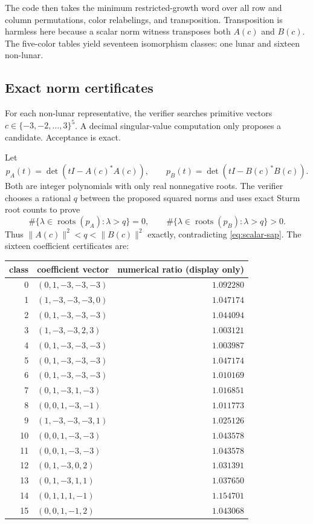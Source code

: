 \documentclass[11pt]{article}
\begin{document}
The code then takes the minimum restricted-growth word over all row and column
permutations, color relabelings, and transposition.  Transposition is harmless
here because a scalar norm witness transposes both $A(c)$ and $B(c)$.  The
five-color tables yield seventeen isomorphism classes: one lunar and sixteen
non-lunar.

\subsection{Exact norm certificates}

For each non-lunar representative, the verifier searches primitive vectors
$c\in\{-3,-2,\ldots,3\}^5$.  A decimal singular-value computation only
proposes a candidate.  Acceptance is exact.

Let
\[
 p_A(t)=\det(tI-A(c)^*A(c)),\qquad
 p_B(t)=\det(tI-B(c)^*B(c)).
\]
Both are integer polynomials with only real nonnegative roots.  The verifier
chooses a rational $q$ between the proposed squared norms and uses exact Sturm
root counts to prove
\[
 \#\{\lambda\in\operatorname{roots}(p_A):\lambda>q\}=0,
 \qquad
 \#\{\lambda\in\operatorname{roots}(p_B):\lambda>q\}>0.
\]
Thus $\|A(c)\|^2<q<\|B(c)\|^2$ exactly, contradicting
\eqref{eq:scalar-sap}.  The sixteen coefficient certificates are:

\begin{center}
\small
\begin{longtable}{@{}r l r@{}}
\toprule
class & coefficient vector & numerical ratio (display only)\\
\midrule
\endhead
0  & $(0,1,-3,-3,-3)$   & $1.092280$\\
1  & $(1,-3,-3,-3,0)$   & $1.047174$\\
2  & $(0,1,-3,-3,-3)$   & $1.044094$\\
3  & $(1,-3,-3,2,3)$    & $1.003121$\\
4  & $(0,1,-3,-3,-3)$   & $1.003987$\\
5  & $(0,1,-3,-3,-3)$   & $1.047174$\\
6  & $(0,1,-3,-3,-3)$   & $1.010169$\\
7  & $(0,1,-3,1,-3)$    & $1.016851$\\
8  & $(0,0,1,-3,-1)$    & $1.011773$\\
9  & $(1,-3,-3,-3,1)$   & $1.025126$\\
10 & $(0,0,1,-3,-3)$    & $1.043578$\\
11 & $(0,0,1,-3,-3)$    & $1.043578$\\
12 & $(0,1,-3,0,2)$     & $1.031391$\\
13 & $(0,1,-3,1,1)$     & $1.037650$\\
14 & $(0,1,1,1,-1)$     & $1.154701$\\
15 & $(0,0,1,-1,2)$     & $1.043068$\\
\bottomrule
\end{longtable}
\end{center}
\end{document}
